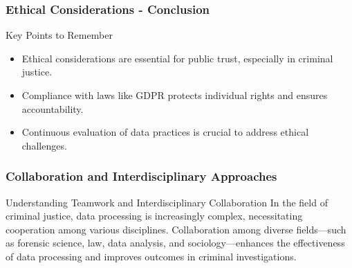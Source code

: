 \documentclass[aspectratio=169]{beamer}
\begin{document}
\begin{frame}[fragile]
    \frametitle{Ethical Considerations - Conclusion}
    \begin{block}{Key Points to Remember}
        \begin{itemize}
            \item Ethical considerations are essential for public trust, especially in criminal justice.
            \item Compliance with laws like GDPR protects individual rights and ensures accountability.
            \item Continuous evaluation of data practices is crucial to address ethical challenges.
        \end{itemize}
    \end{block}
\end{frame}

\begin{frame}[fragile]
    \frametitle{Collaboration and Interdisciplinary Approaches}

    \begin{block}{Understanding Teamwork and Interdisciplinary Collaboration}
        In the field of criminal justice, data processing is increasingly complex, necessitating cooperation among various disciplines. Collaboration among diverse fields—such as forensic science, law, data analysis, and sociology—enhances the effectiveness of data processing and improves outcomes in criminal investigations.
    \end{block}
\end{frame}
\end{document}

